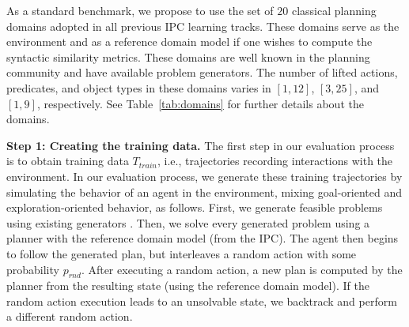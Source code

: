 \documentclass[letterpaper]{article} %
\newcommand{\T}{T}
\newcommand{\Ttrain}{\T_{\textit{train}}}
\newcommand{\miniparagraph}[1]{\textbf{#1.}}
\newif\ifaddcomments
\newcommand{\todo}[1]{\ifaddcomments{\textcolor{red}{[TODO: #1]}}\fi}
\newcommand{\roni}[1]{\ifaddcomments{\textcolor{red}{[Roni: #1]}}\fi}
\newcommand{\leo}[1]{\ifaddcomments{\textcolor{pink}{[Leonardo: #1]}}\fi}
\begin{document}





%
As a standard benchmark, we propose to use the set of $20$ classical planning domains adopted in all previous IPC learning tracks. %
These domains serve as the environment and as a reference domain model if one wishes to compute the syntactic similarity metrics. 
These domains are well known in the planning community and have available problem generators. %
The number of lifted actions, predicates, and object types in these domains varies in 
$[1, 12]$, $[3,25]$, and $[1, 9]$, respectively.
See Table~\ref{tab:domains} for further details about the domains. %

%
\miniparagraph{Step 1: Creating the training data} 
The first step in our evaluation process is to obtain training data $\Ttrain$, i.e., trajectories recording interactions with the environment. 
In our evaluation process, we generate these training trajectories by simulating the behavior of an agent in the environment, mixing goal-oriented and exploration-oriented behavior, as follows. 
First, we generate feasible problems using existing generators \citep{seipp-et-al-zenodo2022}. 
Then, we solve every generated problem using a planner with the reference domain model (from the IPC). 
The agent then begins to follow the generated plan, but interleaves a random action with some probability $p_{rnd}$.  
After executing a random action, a new plan is computed by the planner from the resulting state (using the reference domain model). If the random action execution leads to an unsolvable state, we backtrack and perform a different random action. 
\end{document}
